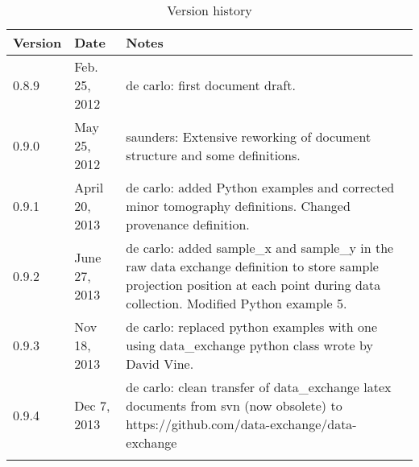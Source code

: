 
\begin{longtable}{p{1.2cm} p{2.6cm}  p{9.9cm}}
\caption{Version history} \\
\bfseries Version & \bfseries Date & \bfseries Notes \\ 
\endhead
\toprule
0.8.9 & Feb. 25, 2012 & de carlo: first document draft. \\
0.9.0 & May 25, 2012 & saunders: Extensive reworking of document structure and some definitions. \\
0.9.1 & April 20, 2013 & de carlo: added Python examples and corrected minor tomography definitions. Changed provenance definition.\\
0.9.2 & June 27, 2013 & de carlo: added sample\_x and sample\_y in the raw data exchange definition to store sample projection position at each point during data collection. Modified Python example 5.\\
0.9.3 & Nov 18, 2013 & de carlo: replaced python examples with one using data\_exchange python class wrote by David Vine.\\
0.9.4 & Dec 7, 2013 & de carlo: clean transfer of data\_exchange latex documents from svn (now obsolete) to https://github.com/data-exchange/data-exchange \\
\bottomrule
\label{table:SI}
\end{longtable}
